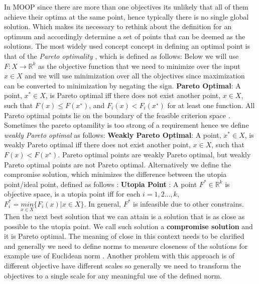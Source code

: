 In MOOP since there are more than one objectives its unlikely that all of them achieve their optima at the same point, hence typically there is no single global solution. Which makes its necessary to rethink about the definition for an optimum and accordingly determine a set of points that can be deemed as the solutions. The most widely used concept concept in defining an optimal point is that of the \textit{Pareto optimality} \cite{pareto1971manual}, which is defined as follows:\newline 
Below we will use $F: X \to \mathbb{R}^k$ as the objective function that we need to minimize over the input $x\in X$ and we will use minimization over all the objectives since maximization can be converted to minimization by negating the sign.\newline\newline
\textbf{Pareto Optimal}: A point, $x^{*} \in X$, is
Pareto optimal iff there does not exist another point, $x \in X$, such that $F(x) \le F(x^{∗})$, and $F_i(x)<F_i(x^{∗})$ for at least one function. 
\newline\newline
All Pareto optimal points lie on the boundary of the feasible criterion space \cite{Athan1996-cm}. Sometimes the pareto optamility is too strong of a requirement hence we define \textit{weakly Pareto optimal} as follows:\newline\newline
\textbf{Weakly Pareto Optimal}: A point, $x^{*} \in X$, is weakly Pareto optimal iff there does not exist another point, $x \in X$, such that $F(x) < F(x^{∗})$.\newline\newline
Pareto optimal points are weakly Pareto optimal, but weakly Pareto optimal points are not Pareto optimal.\newline
Alternatively we define the compromise solution, which minimizes the difference between the utopia point/ideal point, defined as follows \cite{vincent1981optimality}:\newline\newline
\textbf{Utopia Point} \label{ideal_point_def}: A point $F^{*} \in \mathbb{R}^k$ is objective space, is a utopia point iff for each $i = 1, 2 ... ,k$, $F^{*}_i = \underset{x \in X}{min} \{ F_i(x)|x \in X\}$.\newline\newline
In general, $F^{*}$ is infeasible due to other constrains. Then the next best solution that we can attain is a solution that is as close as possible to the utopia point. We call such solution a \textbf{compromise solution} and it is Pareto optimal. The meaning of close in this context needs to be clarified and generally we need to define norms to measure closeness of the solutions for example use of Euclidean norm \cite{vincent1983game}. Another problem with this approach is of different objective have different scales so generally we need to transform the objectives to a single scale for any meaningful use of the defined norm.

